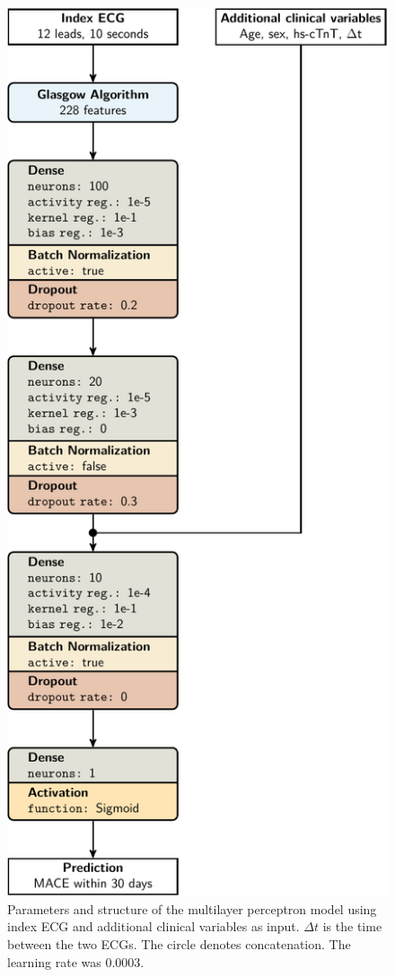 \documentclass[preprint]{elsarticle}
\begin{document}
\begin{figure}[H]
\centering
\includegraphics[scale=\modelscale,keepaspectratio,trim=-16em 0 0 0]{figures/model-mlp3.pdf}
\caption{Parameters and structure of the multilayer perceptron model using index ECG and additional clinical variables as input. $\Delta t$ is the time between the two ECGs. The circle denotes concatenation. The learning rate was 0.0003.}
\end{figure}
\end{document}
